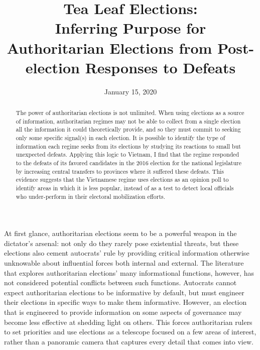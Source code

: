 \documentclass[12pt]{article}
\title{Tea Leaf Elections: \\
	Inferring Purpose for Authoritarian Elections from Post-election Responses to Defeats%
	\\
	\vspace{2ex}
	\vphantom{Online Appendix}}
\date{January 15, 2020}
\newcommand{\1}{\mathbbm{1}}
\begin{document}
	

\maketitle
\thispagestyle{empty}
\doublespacing



\begin{abstract}
The power of authoritarian elections is not unlimited. When using elections as a source of information, authoritarian regimes may not be able to collect from a single election all the information it could theoretically provide, and so they must commit to seeking only some specific signal(s) in each election. It is possible to identify the type of information each regime seeks from its elections by studying its reactions to small but unexpected defeats. Applying this logic to Vietnam, I find that the regime responded to the defeats of its favored candidates in the 2016 election for the national legislature by increasing central transfers to provinces where it suffered these defeats. This evidence suggests that the Vietnamese regime uses elections as an opinion poll to identify areas in which it is less popular, instead of as a test to detect local officials who under-perform in their electoral mobilization efforts.
\end{abstract}



\newpage



At first glance, authoritarian elections seem to be a powerful weapon in the dictator's arsenal: not only do they rarely pose existential threats, but these elections also cement autocrats' rule by providing critical information otherwise unknowable about influential forces both internal and external. The literature that explores authoritarian elections' many informational functions, however, has not considered potential conflicts between such functions. Autocrats cannot expect authoritarian elections to be informative by default, but must engineer their elections in specific ways to make them informative. However, an election that is engineered to provide information on some aspects of governance may become less effective at shedding light on others. This forces authoritarian rulers to set priorities and use elections as a telescope focused on a few areas of interest, rather than a panoramic camera that captures every detail that comes into view.
\end{document}
